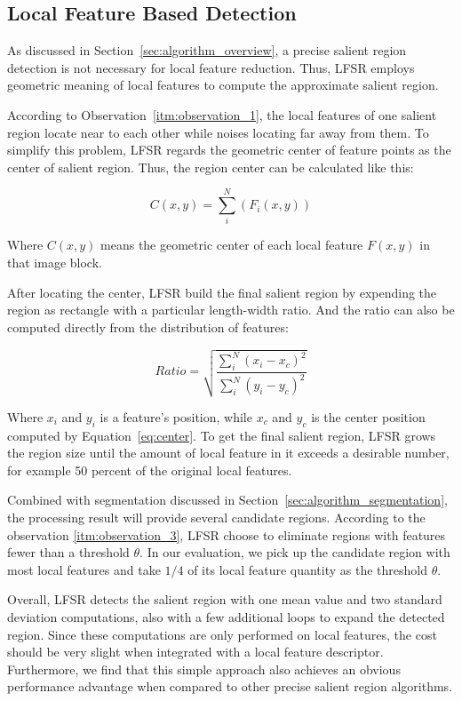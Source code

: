 \subsection{Local Feature Based Detection}
\label{sec:algorithm_detection}

As discussed in Section~\ref{sec:algorithm_overview}, a precise salient region detection is not necessary for local feature reduction. Thus, LFSR employs geometric meaning of local features to compute the approximate salient region.

According to Observation~\ref{itm:observation_1}, the local features of one salient region locate near to each other while noises locating far away from them. To simplify this problem, LFSR regards the geometric center of feature points as the center of salient region. Thus, the region center can be calculated like this:

{\begin{equation} \label{eq:center}
C(x, y) = \sum_{i}^{N}\left({F}_{i}(x, y) \right)
\end{equation}}

Where $C(x, y)$ means the geometric center of each local feature $F(x, y)$ in that image block.

After locating the center, LFSR build the final salient region by expending the region as rectangle with a particular length-width ratio. And the ratio can also be computed directly from the distribution of features:

{\begin{equation} \label{eq:ratio}
Ratio = \sqrt{\frac{\sum_{i}^{N}\left ( x_{i}-x_{c} \right )^{2}}{\sum_{i}^{N}\left ( y_{i}-y_{c} \right )^{2}}}
\end{equation}}

Where $x_{i}$ and $y_{i}$ is a feature's position, while $x_{c}$ and $y_{c}$ is the center position computed by Equation~\ref{eq:center}. To get the final salient region, LFSR grows the region size until the amount of local feature in it exceeds a desirable number, for example 50 percent of the original local features.

Combined with segmentation discussed in Section~\ref{sec:algorithm_segmentation}, the processing result will provide several candidate regions. According to the observation \ref{itm:observation_3}, LFSR choose to eliminate regions with features fewer than a threshold $\theta$. In our evaluation, we pick up the candidate region with most local features and take $1/4$ of its local feature quantity as the threshold $\theta$.

Overall, LFSR detects the salient region with one mean value and two standard deviation computations, also with a few additional loops to expand the detected region. Since these computations are only performed on local features, the cost should be very slight when integrated with a local feature descriptor. Furthermore, we find that this simple approach also achieves an obvious performance advantage when compared to other precise salient region algorithms.